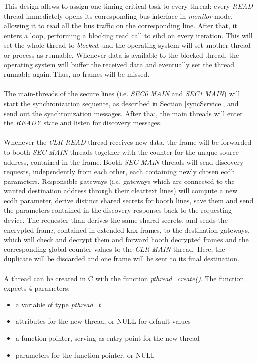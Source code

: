 This design allows to assign one timing-critical task to every thread: every \textit{READ} thread immediately opens its corresponding bus interface in \textit{monitor} mode, allowing it
to read all the bus traffic on the corresponding line. After that, it enters a loop, performing a blocking read call to \gls{eibd} on every iteration.
This will set the whole thread to \textit{blocked}, and the operating
system will set another thread or process as runnable. Whenever data is available to the blocked thread, the operating system will buffer the received data and eventually set the
thread runnable again. Thus, no frames will be missed.
\\
\\
The main-threads of the secure lines (i.e. \textit{SEC0 MAIN} and \textit{SEC1 MAIN}) will start the synchronization sequence, as described in Section \ref{syncService}, and send out
the synchronization messages. After  that, the main threads will enter the \textit{READY} state and listen for discovery messages.
\\
\\
Whenever the \textit{CLR READ} thread receives new data, the frame will be forwarded to booth \textit{SEC MAIN} threads together with the counter for the unique source address, contained
in the frame. Booth \textit{SEC MAIN} threads will send discovery requests, independently from each other, each containing newly chosen \gls{ecdh} parameters. Responsible gateways (i.e.
gateways which are connected to the wanted destination address through their cleartext lines) will compute a new \gls{ecdh} parameter, derive distinct shared secrets for booth lines,
save them and send the parameters contained in the discovery responses back to the requesting device. The requester than derives the same shared secrets, and sends the encrypted frame,
contained in extended \gls{knx} frames, to the destination gateways, which will check and decrypt them and forward booth decrypted frames and the corresponding global counter values
to the \textit{CLR MAIN} thread. Here, the duplicate will be discarded and one frame will be sent to its final destination.
\\
\\
A thread can be created in C with the function \textit{pthread\_create()}. The function expects 4 parameters:
\begin{itemize}
 \item a variable of type \textit{pthread\_t}
 \item attributes for the new thread, or NULL for default values
 \item a function pointer, serving as entry-point for the new thread
 \item parameters for the function pointer, or NULL
\end{itemize}
